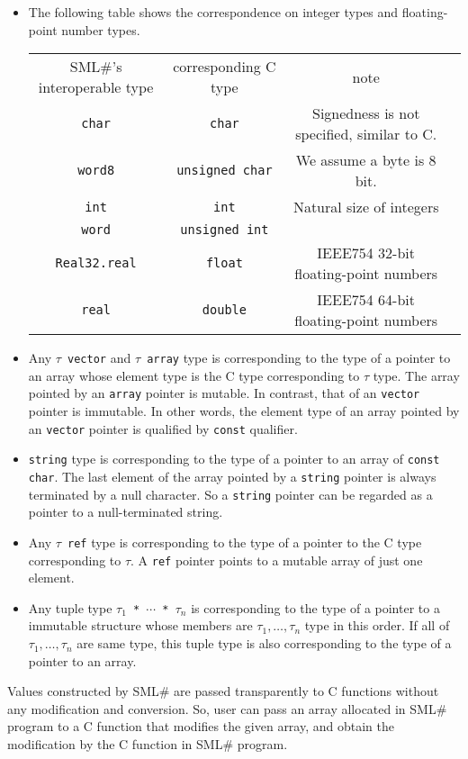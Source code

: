 \documentclass{jbook}
\newcommand{\smlsharp}{SML\#}
\begin{document}
\begin{itemize}
\item The following table shows the correspondence on integer types and
floating-point number types.
\begin{center}
\begin{tabular}{|c|c|c|l|}
\hline
\smlsharp{}'s interoperable type & corresponding C type & note\\
{\tt char} & {\tt char} & Signedness is not specified, similar to C.\\
{\tt word8} & {\tt unsigned char} & We assume a byte is 8 bit.\\
{\tt int} & {\tt int} & Natural size of integers\\
{\tt word} & {\tt unsigned int} &\\
{\tt Real32.real} & {\tt float} & IEEE754 32-bit floating-point numbers\\
{\tt real} & {\tt double} & IEEE754 64-bit floating-point numbers
\end{tabular}
\end{center}
\item
	Any {\tt $\tau$ vector} and {\tt $\tau$ array} type is
corresponding to the type of a pointer to an array whose element type is
the C type corresponding to $\tau$ type.
	The array pointed by an {\tt array} pointer is mutable.
	In contrast, that of an {\tt vector} pointer is immutable.
	In other words,
the element type of an array pointed by an {\tt vector} pointer is qualified
by {\tt const} qualifier.
\item
	{\tt string} type is corresponding to the type of a pointer to an
array of {\tt const char}.
	The last element of the array pointed by a {\tt string} pointer is
always terminated by a null character.
	So a {\tt string} pointer can be regarded as a pointer to a
null-terminated string.
\item
	Any {\tt $\tau$ ref} type is corresponding to the type of a pointer to
the C type corresponding to $\tau$.
	A {\tt ref} pointer points to a mutable array of just one element.
\item
	Any tuple type {\tt $\tau_1$ * $\cdots$ * $\tau_n$} is corresponding to
the type of a pointer to a immutable structure
whose members are $\tau_1,\ldots,\tau_n$ type in this order.
	If all of $\tau_1,\ldots,\tau_n$ are same type,
this tuple type is also corresponding to the type of a pointer to an array.
\end{itemize}
	Values constructed by \smlsharp{} are passed transparently to
C functions without any modification and conversion.
	So, user can pass an array allocated in \smlsharp{} program to
a C function that modifies the given array, and obtain the modification
by the C function in \smlsharp{} program.
\end{document}
